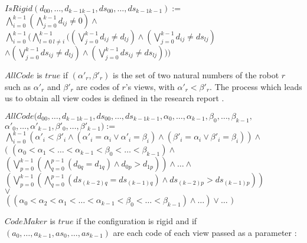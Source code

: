 \documentclass{article}
\begin{document}
\begin{center}

$IsRigid(d_{00}, \ldots ,d_{k-1k-1}, ds_{00}, \ldots ,ds_{k-1k-1}):=$\\
$\bigwedge_{i=0}^{k-1}(\bigwedge_{j=0}^{k-1}d_{ij}\not=0)\land $\\%
$\bigwedge_{i=0}^{k-1}(
\bigwedge_{l=0\ l\not=i}^{k-1}(
(\bigvee_{j=0}^{k-1}d_{ij} \not= d_{lj})
\land (\bigvee_{j=0}^{k-1}d_{ij} \not= ds_{lj})$\\
$\land (\bigvee_{j=0}^{k-1}ds_{ij} \not= d_{lj})
\land (\bigvee_{j=0}^{k-1}ds_{ij} \not= ds_{lj})
) )$\\%
\end{center}

$AllCode$ is $true$ if $(\alpha'_{r}, \beta'_{r})$ is the set of two natural numbers of the robot $r$ such as $\alpha'_r$ and $\beta'_r$ are codes of $r$'s views, with $\alpha'_{r} < \beta'_{r}$. The process which leads us to obtain all view codes is defined in the research report \cite{gathering}. 

\begin{center}
$AllCode(d_{00}, \ldots ,d_{k-1k-1}, ds_{00}, \ldots ,ds_{k-1k-1}, \alpha_{0}, \dots, \alpha_{k-1}, \beta_{0}, \dots, \beta_{k-1},$\\
$\alpha'_{0}, \dots, \alpha'_{k-1}, \beta'_{0}, \dots, \beta'_{k-1}) :=$\\
$\bigwedge_{i = 0}^{k-1} \left( \alpha'_{i} < \beta'_{i} \land (\alpha'_{i} = \alpha_{i} \lor \alpha'_{i} = \beta_{i}) \land (\beta'_{i} = \alpha_{i} \lor \beta'_{i} = \beta_{i}) \right) \land $\\
$($
$(\alpha_{0} < \alpha_{1} < \dots < \alpha_{k-1} < \beta_{0} < \dots < \beta_{k-1}) \land $\\
$(\bigvee_{p=0}^{k-1}(\bigwedge_{q=0}^{p-1}(d_{0q} = d_{1q}) \land d_{0p} > d_{1p} ) )\land \dots \land $\\
$(\bigvee_{p=0}^{k-1}(\bigwedge_{q=0}^{p-1}(ds_{(k-2)q} = ds_{(k-1)q}) \land ds_{(k-2)p} > ds_{(k-1)p} ) )$\\
$\lor $\\
$((\alpha_{0} < \alpha_{2} < \alpha_{1} < \dots < \alpha_{k-1} < \beta_{0} < \dots < \beta_{k-1}) \land \dots) \lor \dots$
$)$
\end{center}

$CodeMaker$ is $true$ if the configuration is rigid and if $(a_{0}, \ldots , a_{k-1}, as_{0}, \ldots , as_{k-1})$ are each code of each view passed as a parameter :
\end{document}
